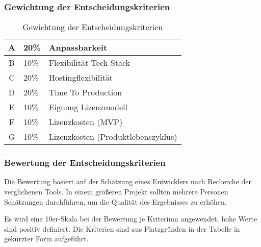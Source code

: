 \subsubsection{Gewichtung der Entscheidungskriterien}
\begin{table}[h]
    \begin{center}
        \begin{tabular}{|c|l|l|}
            \hline
            A & 20\% & Anpassbarkeit                      \\ \hline
            B & 10\% & Flexibilität Tech Stack            \\ \hline
            C & 20\% & Hostingflexibilität                \\ \hline
            D & 20\% & Time To Production                 \\ \hline
            E & 10\% & Eignung Lizenzmodell               \\ \hline
            F & 10\% & Lizenzkosten (MVP)                 \\ \hline
            G & 10\% & Lizenzkosten (Produktlebenszyklus) \\ \hline
        \end{tabular}
    \end{center}
    \caption{Gewichtung der Entscheidungskriterien}
    \label{tab:gewichtung-der-entscheidungskriterien}
\end{table}

\newpage

\subsubsection{Bewertung der Entscheidungskriterien}
Die Bewertung basiert auf der Schätzung eines Entwicklers nach Recherche der verglichenen Tools.
In einem größeren Projekt sollten mehrere Personen Schätzungen durchführen, um die Qualität des Ergebnisses zu erhöhen.

Es wird eine 10er-Skala bei der Bewertung je Kriterium angewendet, hohe Werte sind positiv definiert.
Die Kriterien sind aus Platzgründen in der Tabelle in gekürzter Form aufgeführt.

